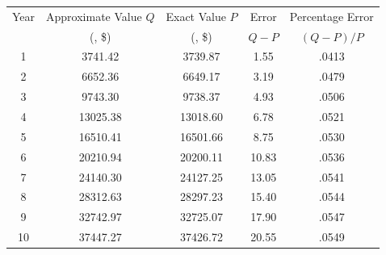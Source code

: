 \begin{center}
\begin{tabular}{ S[table-format=2] *2{S[table-format=6.2]} S[table-format=3.2] S[table-format=1.4] }\toprule
{Year} & {Approximate Value $Q$} & {Exact Value $P$} & {Error} & {Percentage
Error} \\
& {(, \$)} & {(, \$)} & {$Q-P$} & {$(Q-P)/P$} \\ & 3741.42 & 3739.87 & 1.55 & .0413\\
 2 & 6652.36 & 6649.17 & 3.19 & .0479\\
 3 & 9743.30 & 9738.37 & 4.93 & .0506\\
 4 &13025.38 &13018.60 & 6.78 & .0521\\
 5 &16510.41 &16501.66 & 8.75 & .0530\\
 6 &20210.94 &20200.11 &10.83 & .0536\\
 7 &24140.30 &24127.25 &13.05 & .0541\\
 8 &28312.63 &28297.23 &15.40 & .0544\\
 9 &32742.97 &32725.07 &17.90 & .0547\\
10 &37447.27 &37426.72 &20.55 & .0549\\
\bottomrule
\end{tabular}
\end{center}


